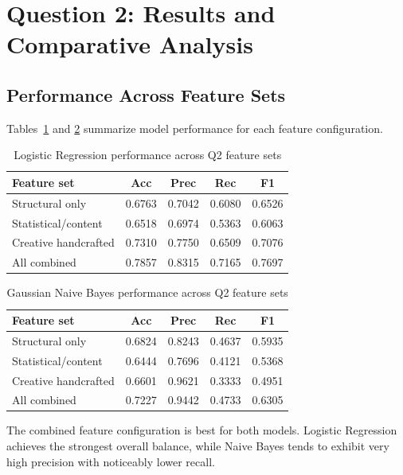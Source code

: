 \section{Question 2: Results and Comparative Analysis}

\subsection{Performance Across Feature Sets}

Tables~\ref{tab:q2-lr} and \ref{tab:q2-nb} summarize model performance for each feature configuration.

\begin{table}[H]
\centering
\caption{Logistic Regression performance across Q2 feature sets}
\label{tab:q2-lr}
\begin{tabular}{lcccc}
\toprule
Feature set & Acc & Prec & Rec & F1 \\
\midrule
Structural only          & 0.6763 & 0.7042 & 0.6080 & 0.6526 \\
Statistical/content      & 0.6518 & 0.6974 & 0.5363 & 0.6063 \\
Creative handcrafted     & 0.7310 & 0.7750 & 0.6509 & 0.7076 \\
All combined             & 0.7857 & 0.8315 & 0.7165 & 0.7697 \\
\bottomrule
\end{tabular}
\end{table}

\begin{table}[H]
\centering
\caption{Gaussian Naive Bayes performance across Q2 feature sets}
\label{tab:q2-nb}
\begin{tabular}{lcccc}
\toprule
Feature set & Acc & Prec & Rec & F1 \\
\midrule
Structural only          & 0.6824 & 0.8243 & 0.4637 & 0.5935 \\
Statistical/content      & 0.6444 & 0.7696 & 0.4121 & 0.5368 \\
Creative handcrafted     & 0.6601 & 0.9621 & 0.3333 & 0.4951 \\
All combined             & 0.7227 & 0.9442 & 0.4733 & 0.6305 \\
\bottomrule
\end{tabular}
\end{table}

The combined feature configuration is best for both models. Logistic Regression achieves the strongest overall balance, while Naive Bayes tends to exhibit very high precision with noticeably lower recall.

